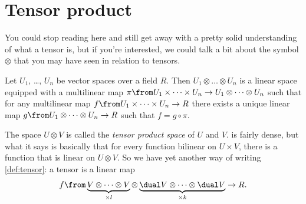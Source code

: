 

\section{Tensor product}%
\label{sec:tensor_product}

You could stop reading here and still get away with a pretty solid understanding of what a tensor is, but if you're interested, we could talk a bit about the symbol $\otimes$ that you may have seen in relation to tensors.

\begin{definition}\label{def:tensor_product}
	Let $U_1$, \dots, $U_n$ be vector spaces over a field $R$.
	Then $U_1 \otimes \dots \otimes U_n$ is a linear space equipped with a multilinear map $\pi \from U_1 \times \dots \times U_n \to U_1 \otimes \dots \otimes U_n$ such that for any multilinear map $f \from U_1 \times \dots \times U_n \to R$ there exists a unique linear map $g \from U_1 \otimes \dots \otimes U_n \to R$ such that $f = g \circ \pi$.
\end{definition}

The space $U \otimes V$ is called the \emph{tensor product space} of $U$ and $V$.
 is fairly dense, but what it says is basically that for every function bilinear on $U \times V$, there is a function that is linear on $U \otimes V$.
So we have yet another way of writing \cref{def:tensor}: a tensor is a linear map
\begin{align*}
	f \from \underbrace{V \otimes \dots \otimes V}_{\times l} \otimes \underbrace{\dual V \otimes \dots \otimes \dual V}_{\times k} \to R.
\end{align*}

